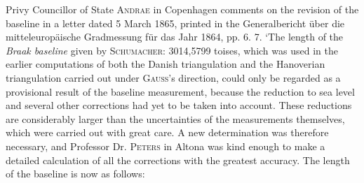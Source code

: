 Privy Councillor of State \textsc{Andrae} in Copenhagen comments on the revision of the baseline in a letter dated 5 March 1865, printed in the Generalbericht über die mitteleuropäische Gradmessung für das Jahr 1864, pp. 6. 7. ‘The length of the \textit{Braak baseline} given by \textsc{Schumacher}: 3014,5799 toises, which was used in the earlier computations of both the Danish triangulation and the Hanoverian triangulation carried out under \textsc{Gauss}’s direction, could only be regarded as a provisional result of the baseline measurement, because the reduction to sea level and several other corrections had yet to be taken into account. These reductions are considerably larger than the uncertainties of the measurements themselves, which were carried out with great care. A new determination was therefore necessary, and Professor Dr. \textsc{Peters} in Altona was kind enough to make a detailed calculation of all the corrections with the greatest accuracy. The length of the baseline is now as follows:
